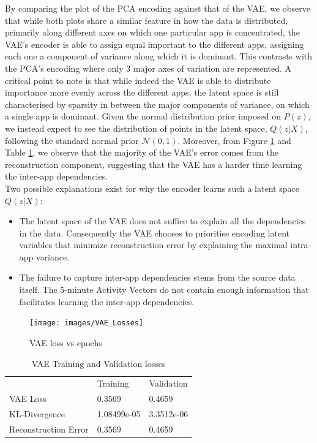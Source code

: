 By comparing the plot of the PCA encoding against that of the VAE, we observe that while both plots share a similar feature in how the data is distributed, primarily along different axes on which one particular app is concentrated, the VAE's encoder is able to assign equal important to the different apps, assigning each one a component of variance along which it is dominant. This contrasts with the PCA's encoding where only 3 major axes of variation are represented. A critical point to note is that while indeed the VAE is able to distribute importance more evenly across the different apps, the latent space is still characterised by sparsity in between the major components of variance, on which a single app is dominant. Given the normal distribution prior imposed on $P(z)$, we instead expect to see the distribution of points in the latent space, $Q(z|X)$, following the standard normal prior $\mathcal{N}(0,1)$. Moreover, from Figure \ref{fig:vae_losses} and Table \ref{my-vae_losses_table}, we observe that the majority of the VAE's error comes from the reconstruction component, suggesting that the VAE has a harder time learning the inter-app dependencies.\\

Two possible explanations exist for why the encoder learns such a latent space $Q(z|X)$:

\begin{itemize}
    \item The latent space of the VAE does not suffice to explain all the dependencies in the data. Consequently the VAE chooses to prioritise encoding latent variables that minimize reconstruction error by explaining the maximal intra-app variance.
    \item The failure to capture inter-app dependencies stems from the source data itself. The 5-minute Activity Vectors do not contain enough information that facilitates learning the inter-app dependencies.
\end{itemize}

 \begin{figure}[htbp]
     \centering
     \texttt{[image: images/VAE\_Losses]}
     \caption{VAE loss vs epochs}
     \label{fig:vae_losses}
 \end{figure}

\begin{table}[htbp]
\centering
\caption{VAE Training and Validation losses}
\label{my-vae_losses_table}
\begin{tabular}{lll}
                     & Training          & Validation        \\
VAE Loss             & 0.3569    & 0.4659    \\
KL-Divergence         & 1.08499e-05 & 3.3512e-06 \\
Reconstruction Error & 0.3569   & 0.4659  
\end{tabular}
\end{table}


